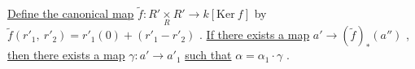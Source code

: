 \begin{center}
\end{center}
\underline{Define the canonical map}  $\tilde{f} : R' \underset{R}{\times} R' \longrightarrow k[\mathrm{Ker}\ f]$  by  $\tilde{f}(r'_1,\ r'_2) = r'_1(0)+(r'_1-r'_2)$ . \underline{If there exists a map}  $a' \longrightarrow (\tilde{f})_*(a'')$  , \underline{then there exists a map}  $\gamma: a' \longrightarrow a'_1$ \underline{such that}  $\alpha = \alpha_1 \cdot \gamma$  .

